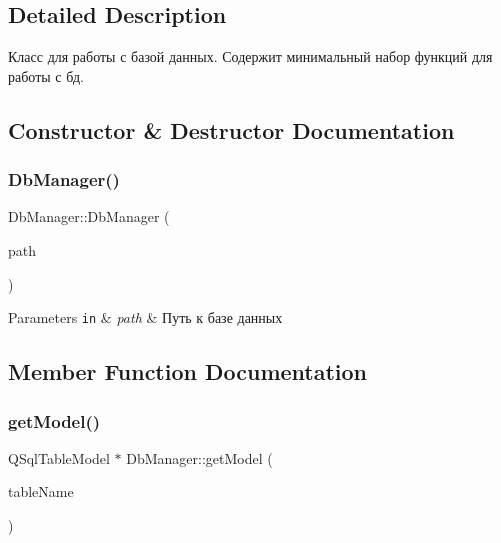\subsection{Detailed Description}
Класс для работы с базой данных. Содержит минимальный набор функций для работы с бд. 

\subsection{Constructor \& Destructor Documentation}
\mbox{\label{class_db_manager_a449b4cc451c4ec493345d799891e7eaa}} 
\subsubsection{\texorpdfstring{Db\+Manager()}{DbManager()}}
{\footnotesize\ttfamily Db\+Manager\+::\+Db\+Manager (\begin{DoxyParamCaption}\item[{const Q\+String \&}]{path }\end{DoxyParamCaption})}


\begin{DoxyParams}[1]{Parameters}
\mbox{\tt in}  & {\em path} & Путь к базе данных \\
\hline
\end{DoxyParams}


\subsection{Member Function Documentation}
\mbox{\label{class_db_manager_a4b9a7828f0d6e53b695da5168570653c}} 
\subsubsection{\texorpdfstring{get\+Model()}{getModel()}}
{\footnotesize\ttfamily Q\+Sql\+Table\+Model $\ast$ Db\+Manager\+::get\+Model (\begin{DoxyParamCaption}\item[{const Q\+String \&}]{table\+Name }\end{DoxyParamCaption})}



